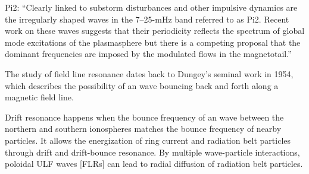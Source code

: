 
Pi2: ``Clearly linked to substorm disturbances and other impulsive dynamics are the irregularly shaped waves in the 7--25-mHz band referred to as Pi2. Recent work on these waves suggests that their periodicity reflects the spectrum of global mode excitations of the plasmasphere but there is a competing proposal that the dominant frequencies are imposed by the modulated flows in the magnetotail.''\cite{kivelson_2006}







The study of field line resonance dates back to Dungey's seminal work in 1954\cite{dungey_1954}, which describes the possibility of an \Alfven wave bouncing back and forth along a magnetic field line.


Drift resonance happens when the bounce frequency of an \Alfven wave between the northern and southern ionospheres matches the bounce frequency of nearby particles. It allows the energization of ring current and radiation belt particles through drift and drift-bounce resonance\cite{elkington_1999,mann_2013,ozeke_2008,southwood_1976}. By multiple wave-particle interactions, poloidal ULF waves [FLRs] can lead to radial diffusion of radiation belt particles\cite{elkington_2003,ozeke_2012,tu_2012}.

